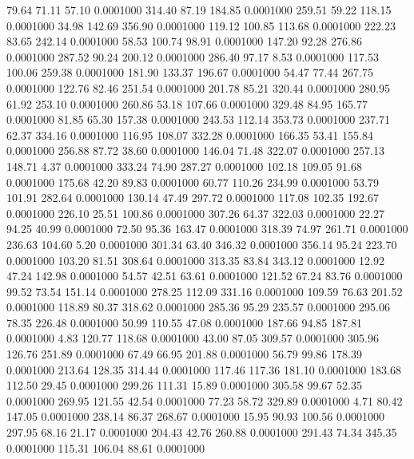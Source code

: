   79.64   71.11   57.10   0.0001000
 314.40   87.19  184.85   0.0001000
 259.51   59.22  118.15   0.0001000
  34.98  142.69  356.90   0.0001000
 119.12  100.85  113.68   0.0001000
 222.23   83.65  242.14   0.0001000
  58.53  100.74   98.91   0.0001000
 147.20   92.28  276.86   0.0001000
 287.52   90.24  200.12   0.0001000
 286.40   97.17    8.53   0.0001000
 117.53  100.06  259.38   0.0001000
 181.90  133.37  196.67   0.0001000
  54.47   77.44  267.75   0.0001000
 122.76   82.46  251.54   0.0001000
 201.78   85.21  320.44   0.0001000
 280.95   61.92  253.10   0.0001000
 260.86   53.18  107.66   0.0001000
 329.48   84.95  165.77   0.0001000
  81.85   65.30  157.38   0.0001000
 243.53  112.14  353.73   0.0001000
 237.71   62.37  334.16   0.0001000
 116.95  108.07  332.28   0.0001000
 166.35   53.41  155.84   0.0001000
 256.88   87.72   38.60   0.0001000
 146.04   71.48  322.07   0.0001000
 257.13  148.71    4.37   0.0001000
 333.24   74.90  287.27   0.0001000
 102.18  109.05   91.68   0.0001000
 175.68   42.20   89.83   0.0001000
  60.77  110.26  234.99   0.0001000
  53.79  101.91  282.64   0.0001000
 130.14   47.49  297.72   0.0001000
 117.08  102.35  192.67   0.0001000
 226.10   25.51  100.86   0.0001000
 307.26   64.37  322.03   0.0001000
  22.27   94.25   40.99   0.0001000
  72.50   95.36  163.47   0.0001000
 318.39   74.97  261.71   0.0001000
 236.63  104.60    5.20   0.0001000
 301.34   63.40  346.32   0.0001000
 356.14   95.24  223.70   0.0001000
 103.20   81.51  308.64   0.0001000
 313.35   83.84  343.12   0.0001000
  12.92   47.24  142.98   0.0001000
  54.57   42.51   63.61   0.0001000
 121.52   67.24   83.76   0.0001000
  99.52   73.54  151.14   0.0001000
 278.25  112.09  331.16   0.0001000
 109.59   76.63  201.52   0.0001000
 118.89   80.37  318.62   0.0001000
 285.36   95.29  235.57   0.0001000
 295.06   78.35  226.48   0.0001000
  50.99  110.55   47.08   0.0001000
 187.66   94.85  187.81   0.0001000
   4.83  120.77  118.68   0.0001000
  43.00   87.05  309.57   0.0001000
 305.96  126.76  251.89   0.0001000
  67.49   66.95  201.88   0.0001000
  56.79   99.86  178.39   0.0001000
 213.64  128.35  314.44   0.0001000
 117.46  117.36  181.10   0.0001000
 183.68  112.50   29.45   0.0001000
 299.26  111.31   15.89   0.0001000
 305.58   99.67   52.35   0.0001000
 269.95  121.55   42.54   0.0001000
  77.23   58.72  329.89   0.0001000
   4.71   80.42  147.05   0.0001000
 238.14   86.37  268.67   0.0001000
  15.95   90.93  100.56   0.0001000
 297.95   68.16   21.17   0.0001000
 204.43   42.76  260.88   0.0001000
 291.43   74.34  345.35   0.0001000
 115.31  106.04   88.61   0.0001000

